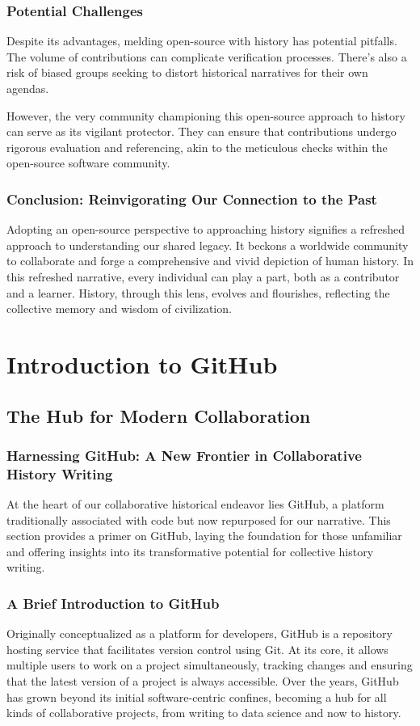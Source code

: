\documentclass[a4paper,12pt]{book}
\begin{document}
\subsection*{Potential Challenges}
Despite its advantages, melding open-source with history has potential pitfalls. The volume of contributions can complicate verification processes. There's also a risk of biased groups seeking to distort historical narratives for their own agendas.

However, the very community championing this open-source approach to history can serve as its vigilant protector. They can ensure that contributions undergo rigorous evaluation and referencing, akin to the meticulous checks within the open-source software community.

\subsection*{Conclusion: Reinvigorating Our Connection to the Past}
Adopting an open-source perspective to approaching history signifies a refreshed approach to understanding our shared legacy. It beckons a worldwide community to collaborate and forge a comprehensive and vivid depiction of human history. In this refreshed narrative, every individual can play a part, both as a contributor and a learner. History, through this lens, evolves and flourishes, reflecting the collective memory and wisdom of civilization.

\chapter{Introduction to GitHub}
\section*{The Hub for Modern Collaboration}
\subsection*{Harnessing GitHub: A New Frontier in Collaborative History Writing}
At the heart of our collaborative historical endeavor lies GitHub, a platform traditionally associated with code but now repurposed for our narrative. This section provides a primer on GitHub, laying the foundation for those unfamiliar and offering insights into its transformative potential for collective history writing.

\subsection*{A Brief Introduction to GitHub}
Originally conceptualized as a platform for developers, GitHub is a repository hosting service that facilitates version control using Git. At its core, it allows multiple users to work on a project simultaneously, tracking changes and ensuring that the latest version of a project is always accessible. Over the years, GitHub has grown beyond its initial software-centric confines, becoming a hub for all kinds of collaborative projects, from writing to data science and now to history.
\end{document}
